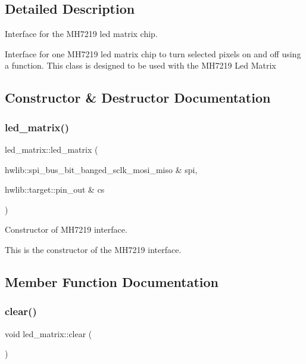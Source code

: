 \subsection{Detailed Description}
Interface for the M\+H7219 led matrix chip. 

Interface for one M\+H7219 led matrix chip to turn selected pixels on and off using a function. This class is designed to be used with the M\+H7219 Led Matrix 

\subsection{Constructor \& Destructor Documentation}
\mbox{\label{classled__matrix_a4b06df3b2766cfde525f14e545d42178}} 
\subsubsection{\texorpdfstring{led\+\_\+matrix()}{led\_matrix()}}
{\footnotesize\ttfamily led\+\_\+matrix\+::led\+\_\+matrix (\begin{DoxyParamCaption}\item[{hwlib\+::spi\+\_\+bus\+\_\+bit\+\_\+banged\+\_\+sclk\+\_\+mosi\+\_\+miso \&}]{spi,  }\item[{hwlib\+::target\+::pin\+\_\+out \&}]{cs }\end{DoxyParamCaption})\hspace{0.3cm}{\ttfamily [inline]}}



Constructor of M\+H7219 interface. 

This is the constructor of the M\+H7219 interface. 

\subsection{Member Function Documentation}
\mbox{\label{classled__matrix_ac92b3805e1af58f4591bf22402c11d7e}} 
\subsubsection{\texorpdfstring{clear()}{clear()}}
{\footnotesize\ttfamily void led\+\_\+matrix\+::clear (\begin{DoxyParamCaption}{ }\end{DoxyParamCaption})\hspace{0.3cm}{\ttfamily [inline]}}



